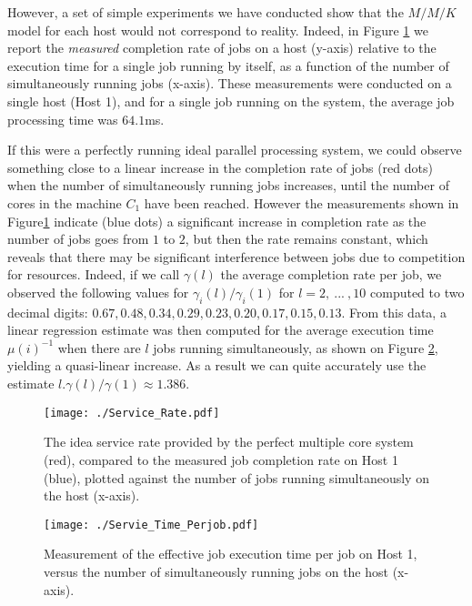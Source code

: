 \documentclass[journal]{IEEEtran}
\begin{document}
However, a set of simple experiments we have conducted show that the $M/M/K$ model for each host would not correspond to reality. Indeed, in Figure \ref{fig:service_rate} we report the {\em measured}
completion rate of jobs on a host (y-axis) relative to the execution time for a single job running by itself, as a function of the number of simultaneously running
jobs (x-axis). These measurements were conducted on a single host (Host 1), and for a single job running on the system, the average
job processing time was $64.1$ms.

If this were a perfectly running ideal parallel processing system, we could observe something close to a linear increase in the completion rate of jobs (red dots) when the number of simultaneously running jobs increases, until the
number of cores in the machine $C_1$ have been reached. However the measurements shown in Figure\ref{fig:service_rate} indicate (blue dots)
a significant increase in completion rate as the number of jobs goes from $1$ to $2$, but then the rate remains constant, which reveals that there may be significant interference between jobs due to competition for resources. Indeed, if we call $\gamma(l)$ the average completion rate per job, we observed the following values for $\gamma_i(l)/\gamma_i(1)$ for $l=2,~...~,10$ computed to two decimal digits:
$0.67, 0.48, 0.34,0.29,0.23, 0.20,0.17, 0.15, 0.13$. From this data, a linear regression estimate was then computed for the average execution time $\mu(i)^{-1}$ when there
are $l$ jobs running simultaneously, as shown on Figure \ref{fig:service_time_perjob}, yielding a quasi-linear increase. As a result we can quite accurately
use the estimate $l.\gamma(l)/\gamma(1)\approx 1.386$. 
\begin{figure}[ht]
     \centering
      \texttt{[image: ./Service\_Rate.pdf]} \caption{The idea service rate provided by the perfect multiple core system (red), compared to the measured job completion rate on Host 1 (blue),
  plotted against the number of jobs running simultaneously on the host (x-axis).}
     \label{fig:service_rate}
    \end{figure}
     \begin{figure}[ht]
     \centering
      \texttt{[image: ./Servie\_Time\_Perjob.pdf]} \caption{Measurement of the effective job execution time per job on Host 1, versus the number of simultaneously running jobs 
     on the host (x-axis).}
     \label{fig:service_time_perjob}
    \end{figure}
\end{document}
